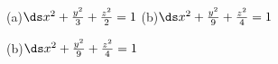{\begin{minipage}[m]{\linewidth}
\centering
{}

(a)\quad $\ds x^2+\frac{y^2}3+\frac{z^2}2=1$ \qquad\qquad (b)\quad $\ds x^2+\frac{y^2}9+\frac{z^2}4=1$
\end{minipage}
}
{(b)\quad $\ds x^2+\frac{y^2}9+\frac{z^2}4=1$
}
